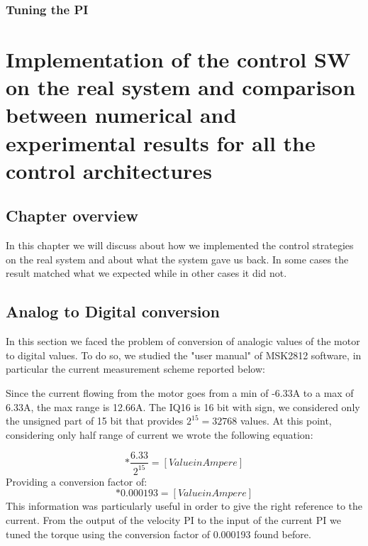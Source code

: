 \documentclass[12pt]{article}
\begin{document}
\subsubsection*{Tuning the PI}

\section{Implementation of the control SW on the real system and comparison between numerical and experimental results for all the control architectures}
\subsection{Chapter overview}
In this chapter we will discuss about how we implemented the control strategies on the real system 
and about what the system gave us back. In some cases the result matched what we expected while in 
other cases it did not.
\subsection{Analog to Digital conversion}
In this section we faced the problem of conversion of analogic values of the motor to digital values.
To do so, we studied the "user manual" of MSK2812 software, in particular the current measurement scheme reported below:


Since the current flowing from the motor goes from a min of -6.33A to a max of 6.33A, the max range is 12.66A.
The IQ16 is 16 bit with sign, we considered only the unsigned part of 15 bit that provides $2^{15}=32768$ values.
At this point, considering only half range of current we wrote the following equation:

\begin{equation}
[Value in Bit]*\frac{6.33}{2^{15}} = [Value in Ampere]
\end{equation}
Providing a conversion factor of:
\begin{equation}
[Value in Bit] * 0.000193 = [Value in Ampere]
\end{equation}
This information was particularly useful in order to give the right reference to the current.
From the output of the velocity PI to the input of the current PI we tuned the torque using the conversion factor of 0.000193 found before.
\end{document}
